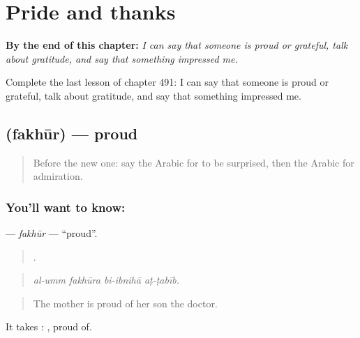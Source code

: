 
\chapter{Pride and thanks}
\label{ch:ar-pride-and-thanks}

\begin{chapteropening}
\textbf{By the end of this chapter:} \emph{I can say that someone is proud or grateful, talk about gratitude, and say that something impressed me.}

Complete the last lesson of chapter 491: I can say that someone is proud or grateful, talk about gratitude, and say that something impressed me.
\end{chapteropening}

\section[\texorpdfstring{\ar{فخور} (fakhūr)}{فخور (fakhūr)}]{ (fakhūr) — proud}

\label{lesson:AR-C491-fakhur}



\begin{quote}
Before the new one: say the Arabic for to be surprised, then the Arabic for admiration.
\end{quote}

\subsection*{You'll want to know: }
\textbf{} — \emph{fakhūr} — \textquotedblleft{}proud\textquotedblright{}.

\begin{quote}
   .
\end{quote}

\begin{quote}
\emph{al-umm fakhūra bi-ibnihā aṭ-ṭabīb.}
\end{quote}

\begin{quote}
The mother is proud of her son the doctor.
\end{quote}

It takes :  , proud of.

